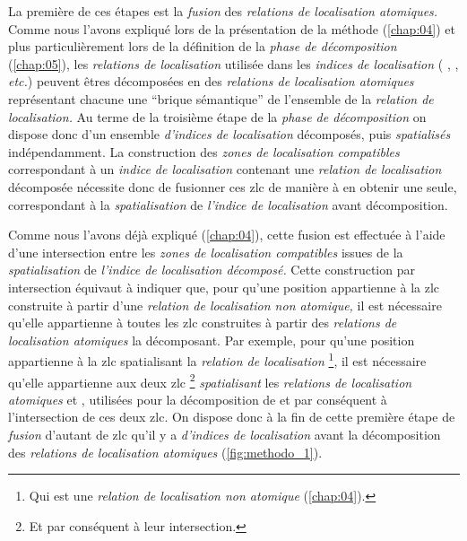 La première de ces étapes est la \emph{fusion} des \emph{relations de
  localisation atomiques.} Comme nous l'avons expliqué lors de la
présentation de la méthode (\autoref{chap:04}) et plus
particulièrement lors de la définition de la \emph{phase de
  décomposition} (\autoref{chap:05}), les \emph{relations de
  localisation} utilisée dans les \emph{indices de localisation} (\eg
{}, , \emph{etc.})
peuvent êtres décomposées en des \emph{relations de localisation
  atomiques} représentant chacune une \enquote{brique sémantique} de
l'ensemble de la \emph{relation de localisation.} Au terme de la
troisième étape de la \emph{phase de décomposition} on dispose donc
d'un ensemble \emph{d'indices de localisation} décomposés, puis
\emph{spatialisés} indépendamment. La construction des \emph{zones de
  localisation compatibles} correspondant à un \emph{indice de
  localisation} contenant une \emph{relation de localisation}
décomposée nécessite donc de fusionner ces \ac{zlc} de manière à en
obtenir une seule, correspondant à la \emph{spatialisation} de
\emph{l'indice de localisation} avant décomposition.

Comme nous l'avons déjà expliqué (\autoref{chap:04}), cette fusion est
effectuée à l'aide d'une intersection entre les \emph{zones de
  localisation compatibles} issues de la \emph{spatialisation} de
\emph{l'indice de localisation décomposé.} Cette construction par
intersection équivaut à indiquer que, pour qu'une position appartienne
à la \ac{zlc} construite à partir d'une \emph{relation de localisation
  non atomique,} il est nécessaire qu'elle appartienne à toutes les
\ac{zlc} construites à partir des \emph{relations de localisation
  atomiques} la décomposant. Par exemple, pour qu'une position
appartienne à la \ac{zlc} spatialisant la \emph{relation de
  localisation}  \footnote{Qui est une
  \emph{relation de localisation non atomique} (\autoref{chap:04}).},
il est nécessaire qu'elle appartienne aux deux \ac{zlc} \footnote{Et
  par conséquent à leur intersection.} \emph{spatialisant} les
\emph{relations de localisation atomiques} 
et , utilisées pour la décomposition de
 et par conséquent à l'intersection de
ces deux \ac{zlc}.
%
On dispose donc à la fin de cette première étape de \emph{fusion}
d'autant de \ac{zlc} qu'il y a \emph{d'indices de localisation} avant
la décomposition des \emph{relations de localisation atomiques}
(\autoref{fig:methodo_1}).

